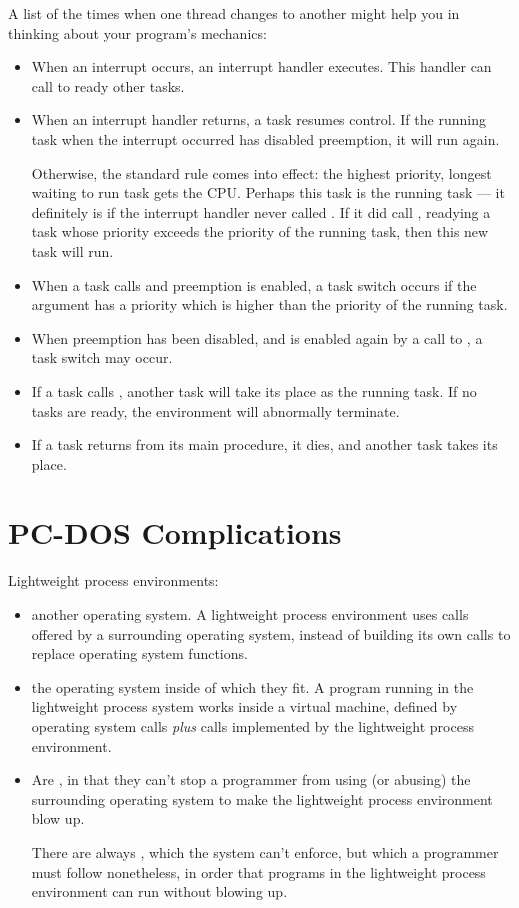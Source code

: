 A list of the times when one thread changes to another might help you in
thinking about your program's mechanics:
\begin{itemize}
\item
 When an interrupt occurs, an interrupt handler executes.  This handler can
 call  to ready other tasks.
\item
 When an interrupt handler returns, a task resumes control.  If the running
 task when the interrupt occurred has disabled preemption, it will run again.
 
 Otherwise, the standard rule comes into effect: the highest priority, longest
 waiting to run task gets the CPU.  Perhaps this task is the running task --- 
 it
 definitely is if the interrupt handler never called .
 If it did call , readying a task whose priority exceeds
 the priority of the running task, then this new task will run.
\item
 When a task calls  and preemption is enabled, a task
 switch occurs if the  argument has a priority which is
 higher than the priority of the running task.
\item
 When preemption has been disabled, and is enabled again by a call to
 , a task switch may occur.
\item
 If a task calls , another task will take its place as
 the running task.  If no tasks are ready, the environment will abnormally
 terminate.
\item
 If a task returns from its main procedure, it dies, and another task takes
 its place.
\end{itemize}

\section{PC-DOS Complications}

Lightweight process environments:
\begin{itemize}
\item
  another operating system.  A lightweight process
 environment uses calls offered by a surrounding operating system, instead
 of building its own calls to replace operating system functions.
\item
  the operating system inside of which they fit.  A program
 running in the lightweight process system works inside a virtual machine,
 defined by operating system calls {\em plus\/} calls implemented by the
 lightweight process environment.
\item
 Are , in that they can't stop a programmer from using (or
 abusing) the surrounding operating system to make the lightweight process
 environment blow up.
 
 There are always , which the system can't enforce, but
 which a programmer must follow nonetheless, in order that programs in the
 lightweight process environment can run without blowing up.
\end{itemize}

